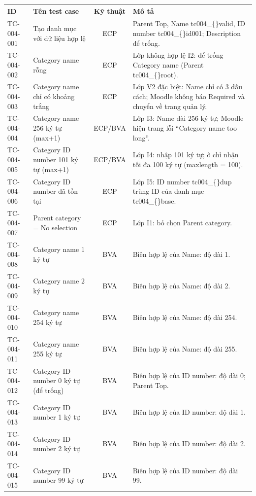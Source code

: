 {\footnotesize
\begin{longtable}{|l|L{4.4cm}|c|L{6.4cm}|}
\hline
{}\textbf{ID} & \textbf{Tên test case} & \textbf{Kỹ thuật} & \textbf{Mô tả} \\ \hline
\endhead
TC-004-001 & Tạo danh mục với dữ liệu hợp lệ & ECP & Parent Top, Name tc004\_\allowbreak\{\}valid, ID number tc004\_\allowbreak\{\}id001; Description để trống. \\ \hline
TC-004-002 & Category name rỗng & ECP & Lớp không hợp lệ I2: để trống Category name (Parent tc004\_\allowbreak\{\}root). \\ \hline
TC-004-003 & Category name chỉ có khoảng trắng & ECP & Lớp V2 đặc biệt: Name chỉ có 3 dấu cách; Moodle không báo Required và chuyển về trang quản lý. \\ \hline
TC-004-004 & Category name 256 ký tự (max+1) & ECP/BVA & Lớp I3: Name dài 256 ký tự; Moodle hiện trang lỗi ``Category name too long''. \\ \hline
TC-004-005 & Category ID number 101 ký tự (max+1) & ECP/BVA & Lớp I4: nhập 101 ký tự; ô chỉ nhận tối đa 100 ký tự (maxlength = 100). \\ \hline
TC-004-006 & Category ID number đã tồn tại & ECP & Lớp I5: ID number tc004\_\allowbreak\{\}dup trùng ID của danh mục tc004\_\allowbreak\{\}base. \\ \hline
TC-004-007 & Parent category = No selection & ECP & Lớp I1: bỏ chọn Parent category. \\ \hline
TC-004-008 & Category name 1 ký tự & BVA & Biên hợp lệ của Name: độ dài 1. \\ \hline
TC-004-009 & Category name 2 ký tự & BVA & Biên hợp lệ của Name: độ dài 2. \\ \hline
TC-004-010 & Category name 254 ký tự & BVA & Biên hợp lệ của Name: độ dài 254. \\ \hline
TC-004-011 & Category name 255 ký tự & BVA & Biên hợp lệ của Name: độ dài 255. \\ \hline
TC-004-012 & Category ID number 0 ký tự (để trống) & BVA & Biên hợp lệ của ID number: độ dài 0; Parent Top. \\ \hline
TC-004-013 & Category ID number 1 ký tự & BVA & Biên hợp lệ của ID number: độ dài 1. \\ \hline
TC-004-014 & Category ID number 2 ký tự & BVA & Biên hợp lệ của ID number: độ dài 2. \\ \hline
TC-004-015 & Category ID number 99 ký tự & BVA & Biên hợp lệ của ID number: độ dài 99. \\ \hline

\end{longtable}}
